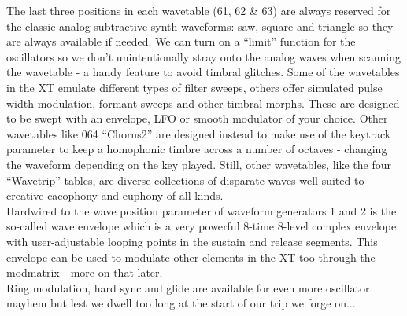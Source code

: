 The last three positions in each wavetable (61, 62 \& 63) are always reserved for the classic analog subtractive synth waveforms: saw, square and triangle so they are always available if needed. We can turn on a ``limit'' function for the oscillators so we don't unintentionally stray onto the analog waves when scanning the wavetable - a handy feature to avoid timbral glitches. Some of the wavetables in the XT emulate different types of filter sweeps, others offer simulated pulse width modulation, formant sweeps and other timbral morphs. These are designed to be swept with an envelope, LFO or smooth modulator of your choice. Other wavetables like 064 ``Chorus2'' are designed instead to make use of the keytrack parameter to keep a homophonic timbre across a number of octaves - changing the waveform depending on the key played. Still, other wavetables, like the four ``Wavetrip'' tables, are diverse collections of disparate waves well suited to creative cacophony and euphony of all kinds.\\
Hardwired to the wave position parameter of waveform generators 1 and 2 is the so-called wave envelope which is a very powerful 8-time 8-level complex envelope with user-adjustable looping points in the sustain and release segments. This envelope can be used to modulate other elements in the XT too through the modmatrix - more on that later.\\
Ring modulation, hard sync and glide are available for even more oscillator mayhem but lest we dwell too long at the start of our trip we forge on...
